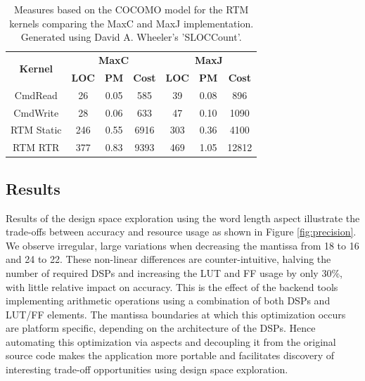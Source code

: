 \begin{table}[!h]
  \renewcommand{\arraystretch}{1.3}
  \centering
  \caption{Measures based on the COCOMO model for the RTM kernels comparing the MaxC and MaxJ
    implementation. Generated using David A. Wheeler's 'SLOCCount'.}
  \label{table:loc}
  \begin{tabular}{c|ccc|ccc}
    \hline
    \multirow{2}{*}{\bf{Kernel}} & \multicolumn{3}{c|}{\bf{MaxC}} & \multicolumn{3}{c}{\bf{MaxJ}}                       \\
    \                            & \bf{LOC}                       & \bf{PM} & \bf{Cost} & \bf{LOC} & \bf{PM} & \bf{Cost} \\
    \hline \hline
    CmdRead                      & 26                             & 0.05    & 585       & 39       & 0.08    & 896       \\
    CmdWrite                     & 28                             & 0.06    & 633       & 47       & 0.10    & 1090      \\
    RTM Static                   & 246                            & 0.55    & 6916      & 303      & 0.36    & 4100      \\
    RTM RTR                      & 377                            & 0.83    & 9393      & 469      & 1.05    & 12812     \\
  \end{tabular}
\end{table}


\subsection{Results}

Results of the design space exploration using the word length aspect
illustrate the trade-offs between accuracy and resource usage as shown
in Figure \ref{fig:precision}. We observe irregular, large variations
when decreasing the mantissa from 18 to 16 and 24 to 22. These
non-linear differences are counter-intuitive, halving the number of
required DSPs and increasing the LUT and FF usage by only 30\%, with
little relative impact on accuracy. This is the effect of the backend
tools implementing arithmetic operations using a combination of both
DSPs and LUT/FF elements. The mantissa boundaries at which this
optimization occurs are platform specific, depending on the
architecture of the DSPs. Hence automating this optimization via
aspects and decoupling it from the original source code makes the
application more portable and facilitates discovery of interesting
trade-off opportunities using design space exploration.

